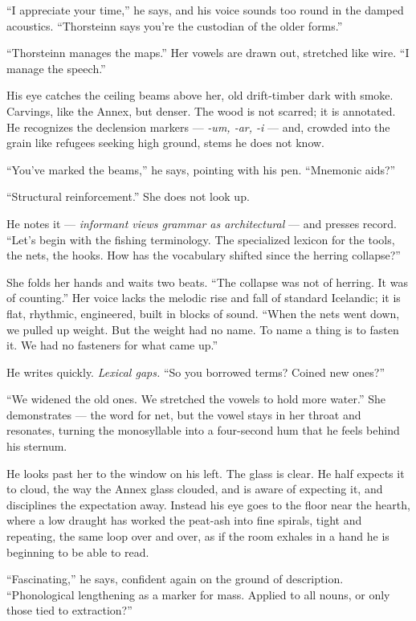 \documentclass[11pt,oneside]{book}
\begin{document}
``I appreciate your time,'' he says, and his voice sounds too round in
the damped acoustics. ``Thorsteinn says you're the custodian of the
older forms.''

``Thorsteinn manages the maps.'' Her vowels are drawn out, stretched
like wire. ``I manage the speech.''

His eye catches the ceiling beams above her, old drift-timber dark with
smoke. Carvings, like the Annex, but denser. The wood is not scarred; it
is annotated. He recognizes the declension markers --- \emph{-um, -ar,
-i} --- and, crowded into the grain like refugees seeking high ground,
stems he does not know.

``You've marked the beams,'' he says, pointing with his pen. ``Mnemonic
aids?''

``Structural reinforcement.'' She does not look up.

He notes it --- \emph{informant views grammar as architectural} --- and
presses record. ``Let's begin with the fishing terminology. The
specialized lexicon for the tools, the nets, the hooks. How has the
vocabulary shifted since the herring collapse?''

She folds her hands and waits two beats. ``The collapse was not of
herring. It was of counting.'' Her voice lacks the melodic rise and fall
of standard Icelandic; it is flat, rhythmic, engineered, built in blocks
of sound. ``When the nets went down, we pulled up weight. But the weight
had no name. To name a thing is to fasten it. We had no fasteners for
what came up.''

He writes quickly. \emph{Lexical gaps.} ``So you borrowed terms? Coined
new ones?''

``We widened the old ones. We stretched the vowels to hold more water.''
She demonstrates --- the word for net, but the vowel stays in her throat
and resonates, turning the monosyllable into a four-second hum that he
feels behind his sternum.

He looks past her to the window on his left. The glass is clear. He half
expects it to cloud, the way the Annex glass clouded, and is aware of
expecting it, and disciplines the expectation away. Instead his eye goes
to the floor near the hearth, where a low draught has worked the
peat-ash into fine spirals, tight and repeating, the same loop over and
over, as if the room exhales in a hand he is beginning to be able to
read.

``Fascinating,'' he says, confident again on the ground of description.
``Phonological lengthening as a marker for mass. Applied to all nouns,
or only those tied to extraction?''
\end{document}
